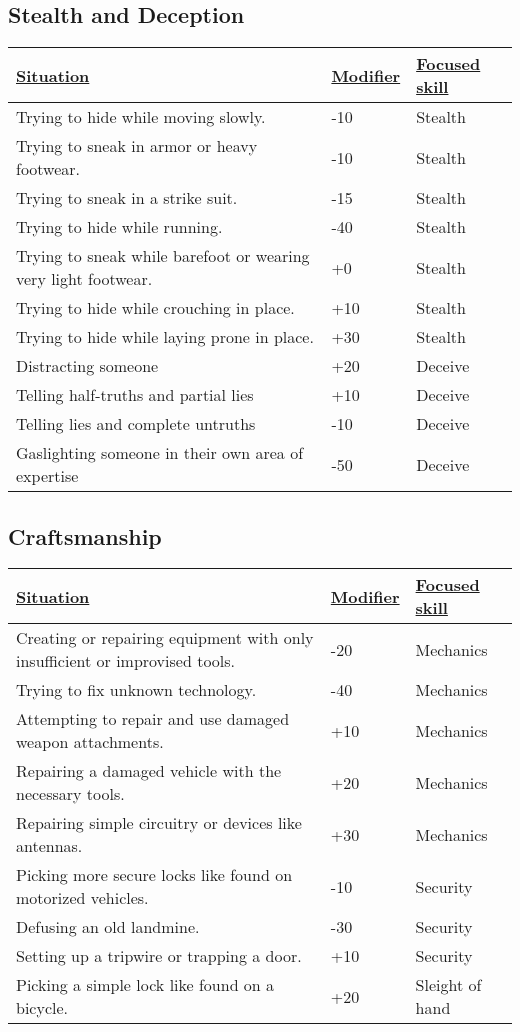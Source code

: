 \subsection{Stealth and Deception}
\begin{tabularx}{\textwidth}{|X|l|l|}
	\hline
	\ul{Situation} & \ul{Modifier} & \ul{Focused skill} \\ \hline
	Trying to hide while moving slowly. & -10 & Stealth \\ \hline
	Trying to sneak in armor or heavy footwear. & -10 & Stealth \\ \hline
	Trying to sneak in a strike suit. & -15 & Stealth \\ \hline
	Trying to hide while running. & -40 & Stealth \\ \hline
	Trying to sneak while barefoot or wearing very light footwear. & +0 & Stealth \\ \hline
	Trying to hide while crouching in place. & +10 & Stealth \\ \hline
	Trying to hide while laying prone in place. & +30 & Stealth \\ \hline
	Distracting someone & +20 & Deceive \\ \hline
	Telling half-truths and partial lies & +10 & Deceive \\ \hline
	Telling lies and complete untruths & -10 & Deceive \\ \hline
	Gaslighting someone in their own area of expertise & -50 & Deceive \\ \hline
\end{tabularx}

\subsection{Craftsmanship}
\begin{tabularx}{\textwidth}{|X|l|l|}
	\hline
	\ul{Situation} & \ul{Modifier} & \ul{Focused skill} \\ \hline
	Creating or repairing equipment with only insufficient or improvised tools. & -20 & Mechanics \\ \hline
	Trying to fix unknown technology. & -40 & Mechanics \\ \hline
	Attempting to repair and use damaged weapon attachments. & +10 & Mechanics \\ \hline
	Repairing a damaged vehicle with the necessary tools. & +20 & Mechanics \\ \hline
	Repairing simple circuitry or devices like antennas. & +30 & Mechanics \\ \hline
	Picking more secure locks like found on motorized vehicles. & -10 & Security \\ \hline
	Defusing an old landmine. & -30 & Security \\ \hline
	Setting up a tripwire or trapping a door. & +10 & Security \\ \hline
	Picking a simple lock like found on a bicycle. & +20 & Sleight of hand \\ \hline
\end{tabularx}
